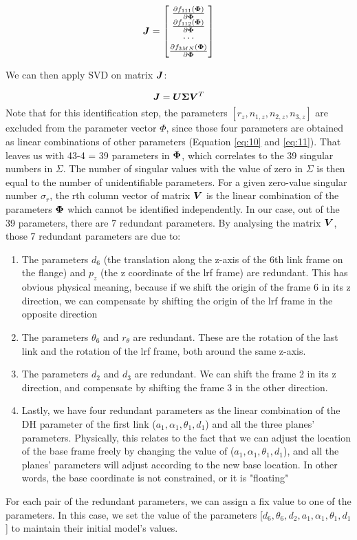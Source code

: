 \renewcommand\arraystretch{1.5}
\begin{equation}
\vb*{J} = \begin{bmatrix}
 \frac{\partial f_{111}(\vb*{\Phi})}{\partial\vb*{\Phi}}\\
 \frac{\partial f_{112}(\vb*{\Phi})}{\partial\vb*{\Phi}}\\
 \cdots \\
 \frac{\partial f_{3MN}(\vb*{\Phi})}{\partial\vb*{\Phi}}\\
	\end{bmatrix}
\end{equation}

We can then apply SVD on matrix $\vb*{J}$:

\begin{equation}
 \vb*{J} = \vb*{U}\vb*{\Sigma}\vb*{V}^T
\end{equation}
Note that for this identification step, the parameters $[r_z, n_{1,z}, n_{2,z}, n_{3,z}]$ are excluded from the parameter vector $\Phi$, since those four parameters are obtained as linear combinations of other parameters (Equation \eqref{eq:10} and \eqref{eq:11}). That leaves us with 43-4 = 39 parameters in $\vb*{\Phi}$, which correlates to the 39 singular numbers in $\Sigma$. The number of singular values with the value of zero in $\Sigma$ is then equal to the number of unidentifiable parameters. For a given zero-value singular number $\sigma_r$, the rth column vector of matrix $\vb*{V}$ is the linear combination of the parameters $\vb*{\Phi}$ which cannot be identified independently. 
In our case, out of the 39 parameters, there are 7 redundant parameters. By analysing the matrix $\vb*{V}$, those 7 redundant parameters are due to:
\begin{enumerate}
\item The parameters $d_6$ (the translation along the z-axis of the 6th link frame on the flange) and $p_z$ (the z coordinate of the \ac{lrf} frame) are redundant. This has obvious physical meaning, because if we shift the origin of the frame 6 in its z direction, we can compensate by shifting the origin of the \ac{lrf} frame in the opposite direction
\item The parameters $\theta_6$ and $r_\theta$ are redundant. These are the rotation of the last link and the rotation of the \ac{lrf} frame, both around the same z-axis. 
\item The parameters $d_2$ and $d_3$ are redundant. We can shift the frame 2 in its z direction, and compensate by shifting the frame 3 in the other direction. 
\item Lastly, we have four redundant parameters as the linear combination of the DH parameter of the first link ($a_1, \alpha_1, \theta_1, d_1$) and all the three planes' parameters. Physically, this relates to the fact that we can adjust the location of the base frame freely by changing the value of ($a_1, \alpha_1, \theta_1, d_1$), and all the planes' parameters will adjust according to the new base location. In other words, the base coordinate is not constrained, or it is "floating"
\end{enumerate}

For each pair of the redundant parameters, we can assign a fix value to one of the parameters. In this case, we set the value of the parameters [$d_6, \theta_6, d_2, a_1, \alpha_1, \theta_1, d_1$] to maintain their initial model's values. 
